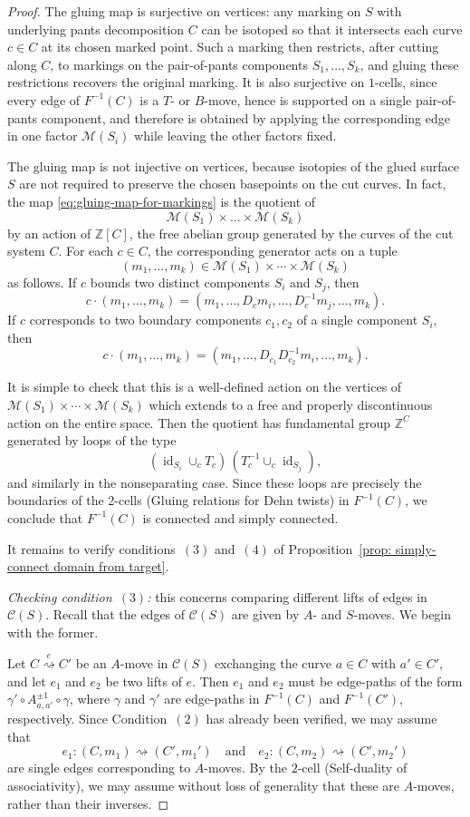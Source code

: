 \documentclass{amsart}
\newcommand{\Z}{\mathbb{Z}}
\newcommand{\pantscpx}{\mathcal{C}}
\newcommand{\xra}[1]{\overset{#1}{\rightsquigarrow}}
\newcommand{\id}{\operatorname{id}}
\theoremstyle{definition}
\numberwithin{equation}{section}
\begin{document}
\begin{proof}
The gluing map is surjective on vertices: any marking on $S$ with underlying pants decomposition $C$ can be isotoped so that it intersects each curve $c\in C$ at its chosen marked point. Such a marking then restricts, after cutting along $C$, to markings on the pair-of-pants components $S_1,\dots,S_k$, and gluing these restrictions recovers the original marking. It is also surjective on $1$-cells, since every edge of $F^{-1}(C)$ is a $T$- or $B$-move, hence is supported on a single pair-of-pants component, and therefore is obtained by applying the corresponding edge in one factor $\mathcal M(S_i)$ while leaving the other factors fixed.

The gluing map is not injective on vertices, because isotopies of the glued surface $S$ are not required to preserve the chosen basepoints on the cut curves. In fact, the map \eqref{eq:gluing-map-for-markings} is the quotient of $$\mathcal{M}(S_1)\times \dots\times \mathcal{M}(S_k)$$ by an action of $\Z[C]$, the free abelian group generated by the curves of the cut system $C$. For each $c\in C$, the corresponding generator acts on a tuple
\[
(m_1,\dots,m_k)\in \mathcal M(S_1)\times\cdots\times \mathcal M(S_k)
\]
as follows. If $c$ bounds two distinct components $S_i$ and $S_j$, then
\[
c\cdot(m_1,\dots,m_k)
=
(m_1,\dots,D_c m_i,\dots,D_c^{-1}m_j,\dots,m_k).
\]
If $c$ corresponds to two boundary components $c_1,c_2$ of a single component $S_i$, then
\[
c\cdot(m_1,\dots,m_k)
=
(m_1,\dots,D_{c_1}D_{c_2}^{-1}m_i,\dots,m_k).
\]

It is simple to check that this is a well-defined action on the vertices of $\mathcal M(S_1)\times\cdots\times \mathcal M(S_k)$ which extends to a free and properly discontinuous action on the entire space. Then the quotient has fundamental group $\Z^C$ generated by loops of the type 
\[
(\id_{S_i}\cup_c T_c)\,(T_c^{-1}\cup_c \id_{S_j}),
\]
and similarly in the nonseparating case. Since these loops are precisely the boundaries of the 2-cells (Gluing relations for Dehn twists) in $F^{-1}(C)$, we conclude that $F^{-1}(C)$ is connected and simply connected.

It remains to verify conditions~$(3)$ and~$(4)$ of Proposition~\ref{prop: simply-connect domain from target}.


\emph{Checking condition~$(3)$:} this concerns comparing different lifts of edges in $\pantscpx(S)$. Recall that the edges of $\pantscpx(S)$ are given by $A$- and $S$-moves. We begin with the former.

Let $C\xra{e}C'$ be an $A$-move in $\pantscpx(S)$ exchanging the curve $a\in C$ with $a'\in C'$, and let $e_1$ and $e_2$ be two lifts of $e$. Then $e_1$ and $e_2$ must be edge-paths of the form $\gamma'\circ A_{a,a'}^{\pm 1} \circ \gamma$, where $\gamma$ and $\gamma'$ are edge-paths in $F^{-1}(C)$ and $F^{-1}(C')$, respectively. Since Condition~$(2)$ has already been verified, we may assume that 
    \[e_1:(C,m_1)\xra{}(C',m_1') \quad\text{and}\quad e_2:(C,m_2)\xra{}(C',m_2')\]
are single edges corresponding to $A$-moves. By the $2$-cell (Self-duality of associativity), we may assume without loss of generality that these are $A$-moves, rather than their inverses.  


\end{proof}
\end{document}
